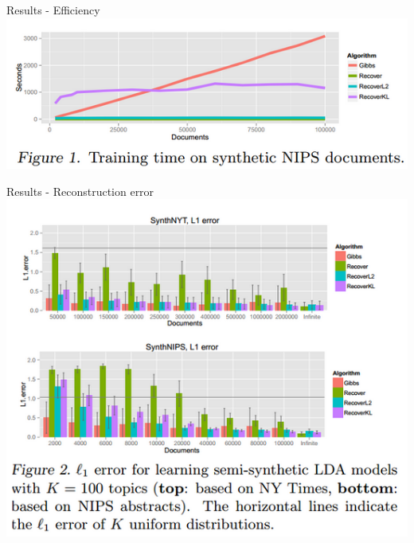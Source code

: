 \documentclass{lecture}
\begin{document}

\begin{plain}{Results - Efficiency}
\centering
\includegraphics[scale=0.6]{figs/results_fig1}
\end{plain}

\begin{plain}{Results - Reconstruction error}
\centering
\includegraphics[scale=0.6]{figs/results_fig2}
\end{plain}
\end{document}
